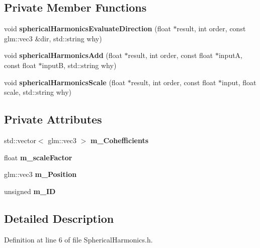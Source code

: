 \subsection*{Private Member Functions}
\begin{DoxyCompactItemize}
\item 
void {\bfseries spherical\+Harmonics\+Evaluate\+Direction} (float $\ast$result, int order, const glm\+::vec3 \&dir, std\+::string why)\hypertarget{class_spherical_harmonics_aaa5c91e3c0f2bed1ccf2f49fa2147747}{}\label{class_spherical_harmonics_aaa5c91e3c0f2bed1ccf2f49fa2147747}

\item 
void {\bfseries spherical\+Harmonics\+Add} (float $\ast$result, int order, const float $\ast$inputA, const float $\ast$inputB, std\+::string why)\hypertarget{class_spherical_harmonics_a9cfbfb534388866352dd2dde1106809c}{}\label{class_spherical_harmonics_a9cfbfb534388866352dd2dde1106809c}

\item 
void {\bfseries spherical\+Harmonics\+Scale} (float $\ast$result, int order, const float $\ast$input, float scale, std\+::string why)\hypertarget{class_spherical_harmonics_ad4f71bf5d418baa21d50e64a6f3501ec}{}\label{class_spherical_harmonics_ad4f71bf5d418baa21d50e64a6f3501ec}

\end{DoxyCompactItemize}
\subsection*{Private Attributes}
\begin{DoxyCompactItemize}
\item 
std\+::vector$<$ glm\+::vec3 $>$ {\bfseries m\+\_\+\+Cohefficients}\hypertarget{class_spherical_harmonics_a3fa5ca4e67713542368a2165e0c4acac}{}\label{class_spherical_harmonics_a3fa5ca4e67713542368a2165e0c4acac}

\item 
float {\bfseries m\+\_\+scale\+Factor}\hypertarget{class_spherical_harmonics_a05f898913f159f83235b7cb8b29877ce}{}\label{class_spherical_harmonics_a05f898913f159f83235b7cb8b29877ce}

\item 
glm\+::vec3 {\bfseries m\+\_\+\+Position}\hypertarget{class_spherical_harmonics_a50459e1ab113fa53145ce4844eb2c4a2}{}\label{class_spherical_harmonics_a50459e1ab113fa53145ce4844eb2c4a2}

\item 
unsigned {\bfseries m\+\_\+\+ID}\hypertarget{class_spherical_harmonics_a9f518092886239dbd82226f48b2890e1}{}\label{class_spherical_harmonics_a9f518092886239dbd82226f48b2890e1}

\end{DoxyCompactItemize}


\subsection{Detailed Description}


Definition at line 6 of file Spherical\+Harmonics.\+h.

